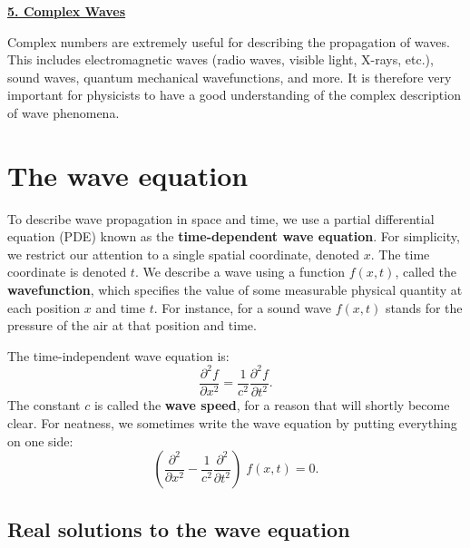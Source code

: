 \documentclass[10pt,a4paper]{article}
\begin{document}
\setcounter{page}{37}
\noindent
\underline{\textbf{\LARGE 5. Complex Waves}}
\vskip 0.1in

Complex numbers are extremely useful for describing the propagation of
waves. This includes electromagnetic waves (radio waves, visible
light, X-rays, etc.), sound waves, quantum mechanical wavefunctions,
and more.  It is therefore very important for physicists to have a
good understanding of the complex description of wave phenomena.

\section{The wave equation}
\label{the-wave-equation}

To describe wave propagation in space and time, we use a partial
differential equation (PDE) known as the \textbf{time-dependent wave
  equation}. For simplicity, we restrict our attention to a single
spatial coordinate, denoted $x$.  The time coordinate is denoted
$t$. We describe a wave using a function $f(x,t)$, called the
\textbf{wavefunction}, which specifies the value of some measurable
physical quantity at each position $x$ and time $t$. For instance, for
a sound wave $f(x,t)$ stands for the pressure of the air at that
position and time.

The time-independent wave equation is:
\begin{equation}
  \frac{\partial^2 f}{\partial x^2} = \frac{1}{c^2} \frac{\partial^2 f}{\partial t^2}.
  \label{wavepde}
\end{equation}
The constant $c$ is called the \textbf{wave speed}, for a reason that
will shortly become clear.  For neatness, we sometimes write the wave
equation by putting everything on one side:
\begin{equation}
  \left(\frac{\partial^2}{\partial x^2} - \frac{1}{c^2} \frac{\partial^2}{\partial t^2}\right) \; f(x,t) = 0.
\end{equation}

\subsection{Real solutions to the wave equation}
\label{real-solutions-to-the-wave-equation}
\end{document}
